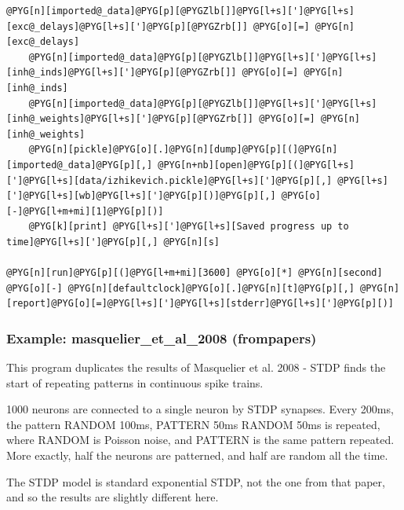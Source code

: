 \documentclass[letterpaper,10pt,english]{manual}
\begin{document}
\begin{Verbatim}[commandchars=@\[\]]
    @PYG[n][imported@_data]@PYG[p][@PYGZlb[]]@PYG[l+s][']@PYG[l+s][exc@_delays]@PYG[l+s][']@PYG[p][@PYGZrb[]] @PYG[o][=] @PYG[n][exc@_delays]
    @PYG[n][imported@_data]@PYG[p][@PYGZlb[]]@PYG[l+s][']@PYG[l+s][inh@_inds]@PYG[l+s][']@PYG[p][@PYGZrb[]] @PYG[o][=] @PYG[n][inh@_inds]
    @PYG[n][imported@_data]@PYG[p][@PYGZlb[]]@PYG[l+s][']@PYG[l+s][inh@_weights]@PYG[l+s][']@PYG[p][@PYGZrb[]] @PYG[o][=] @PYG[n][inh@_weights]
    @PYG[n][pickle]@PYG[o][.]@PYG[n][dump]@PYG[p][(]@PYG[n][imported@_data]@PYG[p][,] @PYG[n+nb][open]@PYG[p][(]@PYG[l+s][']@PYG[l+s][data/izhikevich.pickle]@PYG[l+s][']@PYG[p][,] @PYG[l+s][']@PYG[l+s][wb]@PYG[l+s][']@PYG[p][)]@PYG[p][,] @PYG[o][-]@PYG[l+m+mi][1]@PYG[p][)]
    @PYG[k][print] @PYG[l+s][']@PYG[l+s][Saved progress up to time]@PYG[l+s][']@PYG[p][,] @PYG[n][s]

@PYG[n][run]@PYG[p][(]@PYG[l+m+mi][3600] @PYG[o][*] @PYG[n][second] @PYG[o][-] @PYG[n][defaultclock]@PYG[o][.]@PYG[n][t]@PYG[p][,] @PYG[n][report]@PYG[o][=]@PYG[l+s][']@PYG[l+s][stderr]@PYG[l+s][']@PYG[p][)]
\end{Verbatim}

\resetcurrentobjects
\hypertarget{--doc-examples-frompapers_masquelier_et_al_2008}{}

\hypertarget{index-34}{}\subsubsection{Example: masquelier\_et\_al\_2008 (frompapers)}

This program duplicates the results of Masquelier et al. 2008 - STDP finds the
start of repeating patterns in continuous spike trains.

1000 neurons are connected to a single neuron by STDP synapses. Every 200ms,
the pattern RANDOM 100ms, PATTERN 50ms RANDOM 50ms is repeated, where RANDOM
is Poisson noise, and PATTERN is the same pattern repeated. More exactly,
half the neurons are patterned, and half are random all the time.

The STDP model is standard exponential STDP, not the one from that paper, and so
the results are slightly different here.
\end{document}
